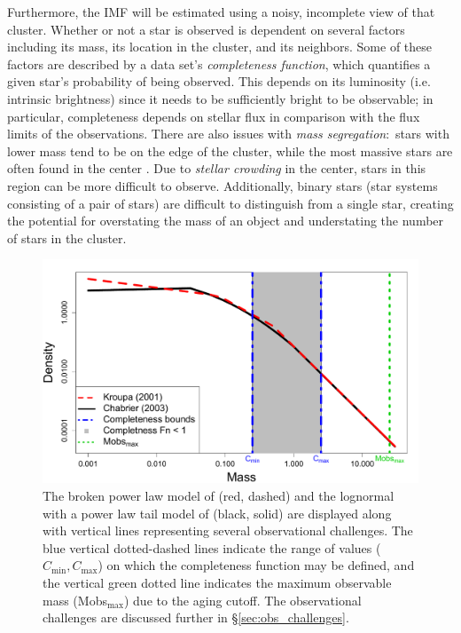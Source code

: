 \documentclass[12pt]{article}
\begin{document}
Furthermore, the IMF will be estimated using a noisy, incomplete view of that cluster.  Whether or not a star is observed is dependent on several factors including its mass, its location in the cluster, and its neighbors.  Some of these factors are described by a data set's \emph{completeness function}, which quantifies a given star's probability of being observed.  This depends on its luminosity (i.e. intrinsic brightness) since it needs to be sufficiently bright to be observable; in particular, completeness depends on stellar flux in comparison with the flux limits of the observations.
There are also issues with {\it mass segregation}:~stars with lower mass tend to be on the edge of the cluster, while the most massive stars are often
found in the center \citep{weisz13}. Due to {\it stellar crowding} in the center, stars in this region can be more difficult to observe.  Additionally, binary stars (star systems consisting of a pair of stars) 
are difficult to distinguish from a single star, creating the potential for overstating the mass of an object and understating the number of stars in the cluster.


\begin{figure}[htbp]
   \centering
\includegraphics[width = .5\textwidth]{figures/CompareOthers3.pdf} 
   \caption{The broken power law model of \cite{kroupa2001} (red, dashed) and the lognormal with a power law tail model of \cite{Chabrier:2003om, Chabrier:2003oq} (black, solid) are displayed along with vertical lines representing several observational challenges.  The blue vertical dotted-dashed lines indicate the range of values ($C_{\min}, C_{\max}$) on which the completeness function may be defined, and the vertical green dotted line indicates the maximum observable mass (Mobs$_{\max}$) due to the aging cutoff.  The observational challenges are discussed further in \S\ref{sec:obs_challenges}.}
   \label{fig:imf_models}
\end{figure}
\end{document}

